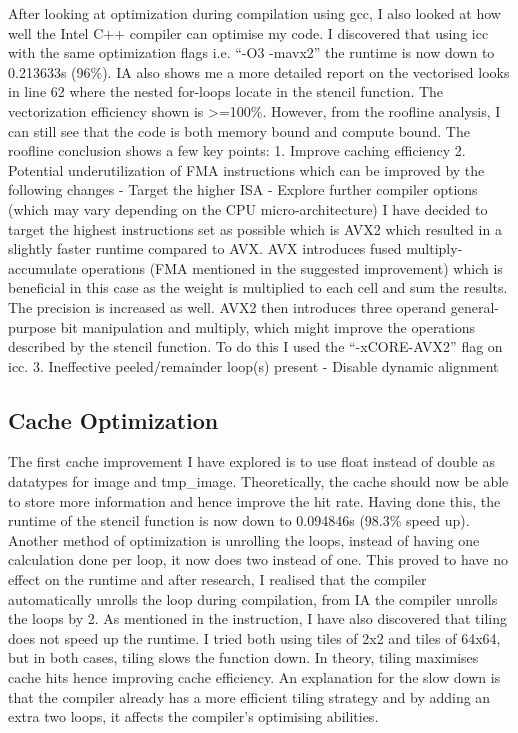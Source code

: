 \documentclass{article}
\begin{document}
After looking at optimization during compilation using gcc, I also
looked at how well the Intel C++ compiler can optimise my code. I
discovered that using icc with the same optimization flags i.e. ``-O3
-mavx2'' the runtime is now down to 0.213633s (96\%). IA also shows me a more
detailed report on the vectorised looks in line 62 where the nested
for-loops locate in the stencil function. The vectorization efficiency
shown is \textgreater{}=100\%. However, from the roofline analysis, I
can still see that the code is both memory bound and compute bound. The
roofline conclusion shows a few key points: 1. Improve caching
efficiency 2. Potential underutilization of FMA instructions which can
be improved by the following changes - Target the higher ISA - Explore
further compiler options (which may vary depending on the CPU
micro-architecture) I have decided to target the highest instructions
set as possible which is AVX2 which resulted in a slightly faster
runtime compared to AVX. AVX introduces fused multiply-accumulate
operations (FMA mentioned in the suggested improvement) which is
beneficial in this case as the weight is multiplied to each cell and sum
the results. The precision is increased as well. AVX2 then introduces
three operand general-purpose bit manipulation and multiply, which might
improve the operations described by the stencil function. To do this I
used the ``-xCORE-AVX2'' flag on icc. 3. Ineffective peeled/remainder
loop(s) present - Disable dynamic alignment

\subsection{Cache Optimization}

The first cache improvement I have explored is to use float instead of
double as datatypes for image and tmp\_image. Theoretically, the cache
should now be able to store more information and hence improve the hit
rate. Having done this, the runtime of the stencil function is now down
to 0.094846s (98.3\% speed up). Another method of optimization is unrolling
the loops, instead of having one calculation done per loop, it now does two
instead of one. This proved to have no effect on the runtime and after research,
I realised that the compiler automatically unrolls the loop during
compilation, from IA the compiler unrolls the loops by 2. As mentioned
in the instruction, I have also discovered that tiling does not speed up
the runtime. I tried both using tiles of 2x2 and tiles of 64x64, but in
both cases, tiling slows the function down. In theory, tiling maximises
cache hits hence improving cache efficiency. An explanation for the slow
down is that the compiler already has a more efficient tiling strategy
and by adding an extra two loops, it affects the compiler's optimising
abilities.
\end{document}
